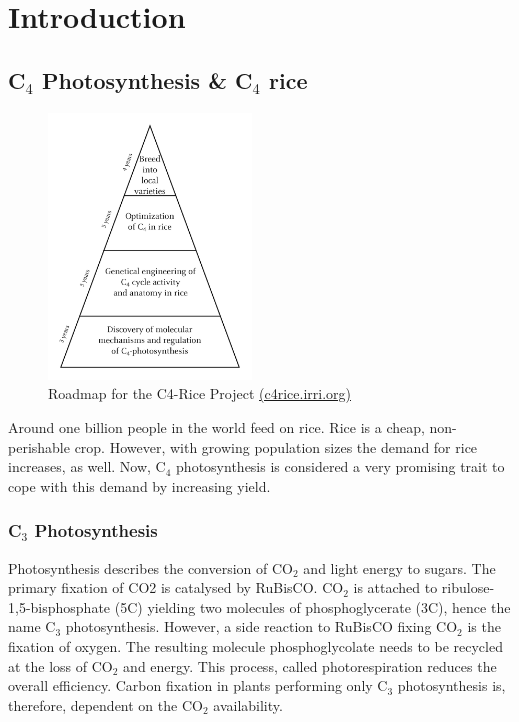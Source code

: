 \chapter{Introduction}
\section{C$_4$ Photosynthesis \& C$_4$ rice}

\begin{figure}%
	\includegraphics[width=0.48\textwidth]{images/C4_roadmap}%
	\caption{Roadmap for the C4-Rice Project \href{http://c4rice.irri.org}{(c4rice.irri.org)}}%
	\label{fig:c4rice_roadmap}%
\end{figure}

Around one billion people in the world feed on rice.
Rice is a cheap, non-perishable crop.
However, with growing population sizes the demand for rice increases, as well.
Now, C$_4$ photosynthesis is considered a very promising trait to cope with this demand by increasing yield.
\subsection{C$_3$ Photosynthesis}
Photosynthesis describes the conversion of CO$_2$ and light energy to sugars.
The primary fixation of CO2 is catalysed by RuBisCO.
CO$_2$ is attached to ribulose-1,5-bisphosphate (5C) yielding two molecules of phosphoglycerate (3C), hence the name C$_3$ photosynthesis.
However, a side reaction to RuBisCO fixing CO$_2$ is the fixation of oxygen.
The resulting molecule phosphoglycolate needs to be recycled at the loss of CO$_2$ and energy.
This process, called photorespiration reduces the overall efficiency.
Carbon fixation in plants performing only C$_3$ photosynthesis is, therefore, dependent on the CO$_2$ availability.

